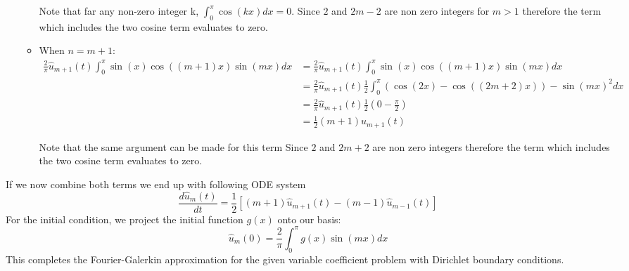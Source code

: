 \begin{itemize}
\begin{itemize}
		            Note that far any non-zero integer k, $\int_0^\pi\cos(kx) dx = 0 $. Since $2$ and $2m - 2$ are non zero integers for $m > 1$ therefore the term which includes the two cosine term evaluates to zero.
		      \item When $n = m+1$:
		            \begin{equation}
			            \begin{aligned}
				            \frac{2}{\pi} \hat{u}_{m+1}(t) \int_0^\pi \sin(x) \cos((m+1)x) \sin(mx) dx & = 	\frac{2}{\pi} \hat{u}_{m+1}(t) \int_0^\pi \sin(x) \cos((m+1)x) \sin(mx) dx                         \\
				                                                                                       & = 	\frac{2}{\pi} \hat{u}_{m+1}(t) \frac{1}{2}\int_0^\pi (\cos (2x) - \cos((2m + 2)x)) - \sin(mx)^2 dx \\
				                                                                                       & = 	\frac{2}{\pi} \hat{u}_{m+1}(t) \frac{1}{2} \left ( 0 -\frac{\pi}{2} \right)                        \\
				                                                                                       & = \frac{1}{2} (m + 1) \hat{u}_{m+1}(t)
				            \label{eq:nm-1}
			            \end{aligned}
		            \end{equation}

		            Note that the same argument can be made for this term Since $2$ and $2m + 2$ are non zero integers therefore the term which includes the two cosine term evaluates to zero.
	      \end{itemize}
\end{itemize}
If we now combine both terms we end up with following ODE system
\begin{equation}
	\frac{d \hat{u}_m(t)}{dt} = \frac{1}{2} [(m+1)\hat{u}_{m+1}(t) - (m-1)\hat{u}_{m-1}(t)]
	\label{eq:final_ode}
\end{equation}
For the initial condition, we project the initial function $g(x)$ onto our basis:
\begin{equation}
	\hat{u}_m(0) = \frac{2}{\pi}\int_0^{\pi} g(x)\sin(mx) dx
	\label{eq:init2}
\end{equation}
This completes the Fourier-Galerkin approximation for the given variable coefficient problem with Dirichlet boundary conditions.
